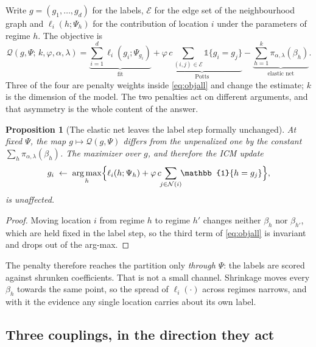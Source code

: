 \documentclass[11pt,a4paper]{article}
\newtheorem{proposition}{Proposition}
\DeclareMathOperator*{\argmax}{arg\,max}
\begin{document}
Write $g = (g_1,\dots,g_d)$ for the labels, $\mathcal{E}$ for the edge set of
the neighbourhood graph and $\ell_i(h;\Psi_h)$ for the contribution of location
$i$ under the parameters of regime $h$. The objective is
\begin{equation}
  \mathcal{Q}(g,\Psi;\, k,\varphi,\alpha,\lambda)
  = \underbrace{\sum_{i=1}^{d}\ell_i(g_i;\Psi_{g_i})}_{\text{fit}}
  + \underbrace{\varphi\,c\!\!\sum_{(i,j)\in\mathcal{E}}\!\!
      \mathbb{1}\{g_i=g_j\}}_{\text{Potts}}
  - \underbrace{\sum_{h=1}^{k}\pi_{\alpha,\lambda}(\beta_h)}_{\text{elastic net}} .
  \label{eq:objall}
\end{equation}
Three of the four are penalty weights inside \eqref{eq:objall} and change the
estimate; $k$ is the dimension of the model. The two penalties act on different
arguments, and that asymmetry is the whole content of the answer.

\begin{proposition}[The elastic net leaves the label step formally unchanged]
\label{prop:labels}
At fixed $\Psi$, the map $g \mapsto \mathcal{Q}(g,\Psi)$ differs from the
unpenalized one by the constant $\sum_h \pi_{\alpha,\lambda}(\beta_h)$. The
maximizer over $g$, and therefore the ICM update
\[
  g_i \;\leftarrow\;
  \argmax_{h} \Bigl\{ \ell_i(h;\Psi_h)
    + \varphi\,c \!\!\sum_{j \in \mathcal{N}(i)}\!\! \mathbb{1}\{h = g_j\} \Bigr\},
\]
is unaffected.
\end{proposition}
\begin{proof}
Moving location $i$ from regime $h$ to regime $h'$ changes neither $\beta_h$
nor $\beta_{h'}$, which are held fixed in the label step, so the third term of
\eqref{eq:objall} is invariant and drops out of the arg-max.
\end{proof}

The penalty therefore reaches the partition only \emph{through} $\Psi$: the
labels are scored against shrunken coefficients. That is not a small channel.
Shrinkage moves every $\beta_h$ towards the same point, so the spread of
$\ell_i(\cdot)$ across regimes narrows, and with it the evidence any single
location carries about its own label.

\subsection{Three couplings, in the direction they act}
\end{document}
